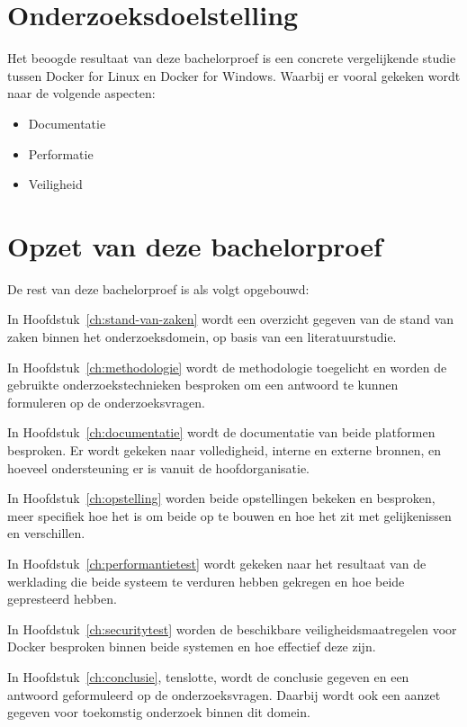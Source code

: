 \section{Onderzoeksdoelstelling}
\label{sec:onderzoeksdoelstelling}


Het beoogde resultaat van deze bachelorproef is een concrete vergelijkende studie tussen Docker for Linux en Docker for Windows. Waarbij er vooral gekeken wordt naar de volgende aspecten:
\begin{itemize}[noitemsep]
	\item Documentatie
	\item Performatie
	\item Veiligheid
\end{itemize}

\section{Opzet van deze bachelorproef}
\label{sec:opzet-bachelorproef}


De rest van deze bachelorproef is als volgt opgebouwd:

In Hoofdstuk~\ref{ch:stand-van-zaken} wordt een overzicht gegeven van de stand van zaken binnen het onderzoeksdomein, op basis van een literatuurstudie.

In Hoofdstuk~\ref{ch:methodologie} wordt de methodologie toegelicht en worden de gebruikte onderzoekstechnieken besproken om een antwoord te kunnen formuleren op de onderzoeksvragen.


In Hoofdstuk~\ref{ch:documentatie} wordt de documentatie van beide platformen besproken. Er wordt gekeken naar volledigheid, interne en externe bronnen, en hoeveel ondersteuning er is vanuit de hoofdorganisatie.

In Hoofdstuk~\ref{ch:opstelling} worden beide opstellingen bekeken en besproken, meer specifiek hoe het is om beide op te bouwen en hoe het zit met gelijkenissen en verschillen.

In Hoofdstuk~\ref{ch:performantietest} wordt gekeken naar het resultaat van de werklading die beide systeem te verduren hebben gekregen en hoe beide gepresteerd hebben.

In Hoofdstuk~\ref{ch:securitytest} worden de beschikbare veiligheidsmaatregelen voor Docker besproken binnen beide systemen en hoe effectief deze zijn.

In Hoofdstuk~\ref{ch:conclusie}, tenslotte, wordt de conclusie gegeven en een antwoord geformuleerd op de onderzoeksvragen. Daarbij wordt ook een aanzet gegeven voor toekomstig onderzoek binnen dit domein.

